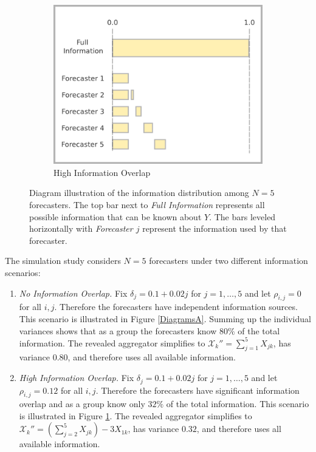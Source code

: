 \documentclass[11pt]{article}
\theoremstyle{definition}
\theoremstyle{definition}
\begin{document}
\begin{figure}[t!]
\begin{subfigure}[b]{0.49\textwidth}
                \includegraphics[width=\textwidth]{DepDiagram}
                \caption{High Information Overlap}
                \label{DiagramsB}
        \end{subfigure}
   \caption{Diagram illustration of the information distribution among $N = 5$ forecasters. The top bar next to \textit{Full Information} represents all possible information that can be known about $Y$. The bars leveled horizontally with \textit{Forecaster $j$} represent the information used by that forecaster.}    
        \label{Diagrams}
\end{figure}


The simulation study considers $N = 5$ forecasters under two different information scenarios: 
\begin{enumerate}
\item[] \textit{No Information Overlap.}  Fix $\delta_j = 0.1 + 0.02j$ for $j = 1, \dots, 5$ and let $\rho_{i,j} = 0$ for all $i,j$. Therefore the forecasters have independent information sources. This scenario is illustrated in Figure \ref{DiagramsA}. Summing up the individual variances shows that as a group the forecasters know $80\%$ of the total information. The revealed aggregator simplifies to $\mathcal{X}_k'' = \sum_{j=1}^5 X_{jk}$, has variance $0.80$, and therefore uses all available information.


\item[] \textit{High Information Overlap.} Fix $\delta_j = 0.1 + 0.02j$ for $j = 1, \dots, 5$ and let $\rho_{i,j} = 0.12$ for all $i,j$. Therefore the forecasters have significant information overlap and as a group know only $32\%$ of the total information. This scenario is illustrated in Figure \ref{DiagramsB}. The revealed aggregator simplifies to $ \mathcal{X}_k'' = \left( \sum_{j=2}^5 X_{jk} \right) - 3X_{1k}$, has variance $0.32$, and therefore uses all available information.
\end{enumerate}
\end{document}
